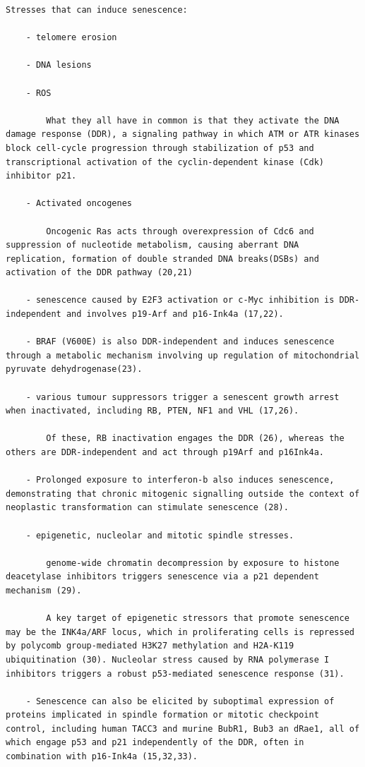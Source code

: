 \documentclass[
]{book}
\begin{document}
\begin{verbatim}
Stresses that can induce senescence:

    - telomere erosion

    - DNA lesions

    - ROS

        What they all have in common is that they activate the DNA damage response (DDR), a signaling pathway in which ATM or ATR kinases block cell-cycle progression through stabilization of p53 and transcriptional activation of the cyclin-dependent kinase (Cdk) inhibitor p21.

    - Activated oncogenes

        Oncogenic Ras acts through overexpression of Cdc6 and suppression of nucleotide metabolism, causing aberrant DNA replication, formation of double stranded DNA breaks(DSBs) and activation of the DDR pathway (20,21)

    - senescence caused by E2F3 activation or c-Myc inhibition is DDR-independent and involves p19-Arf and p16-Ink4a (17,22).

    - BRAF (V600E) is also DDR-independent and induces senescence through a metabolic mechanism involving up regulation of mitochondrial pyruvate dehydrogenase(23).

    - various tumour suppressors trigger a senescent growth arrest when inactivated, including RB, PTEN, NF1 and VHL (17,26).

        Of these, RB inactivation engages the DDR (26), whereas the others are DDR-independent and act through p19Arf and p16Ink4a.

    - Prolonged exposure to interferon-b also induces senescence, demonstrating that chronic mitogenic signalling outside the context of neoplastic transformation can stimulate senescence (28).

    - epigenetic, nucleolar and mitotic spindle stresses.

        genome-wide chromatin decompression by exposure to histone deacetylase inhibitors triggers senescence via a p21 dependent mechanism (29).

        A key target of epigenetic stressors that promote senescence may be the INK4a/ARF locus, which in proliferating cells is repressed by polycomb group-mediated H3K27 methylation and H2A-K119 ubiquitination (30). Nucleolar stress caused by RNA polymerase I inhibitors triggers a robust p53-mediated senescence response (31).

    - Senescence can also be elicited by suboptimal expression of proteins implicated in spindle formation or mitotic checkpoint control, including human TACC3 and murine BubR1, Bub3 an dRae1, all of which engage p53 and p21 independently of the DDR, often in combination with p16-Ink4a (15,32,33).
\end{verbatim}
\end{document}
